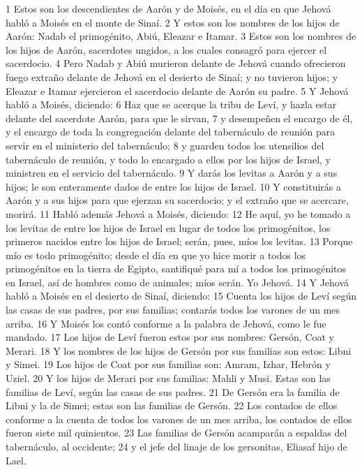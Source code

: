 1 Estos son los descendientes de Aarón y de Moisés, en el día en que Jehová habló a Moisés en el monte de Sinaí.
2 Y estos son los nombres de los hijos de Aarón: Nadab el primogénito, Abiú, Eleazar e Itamar. 
3 Estos son los nombres de los hijos de Aarón, sacerdotes ungidos, a los cuales consagró para ejercer el sacerdocio. 
4 Pero Nadab y Abiú murieron delante de Jehová cuando ofrecieron fuego extraño delante de Jehová en el desierto de Sinaí; y no tuvieron hijos; y Eleazar e Itamar ejercieron el sacerdocio delante de Aarón su padre.
5 Y Jehová habló a Moisés, diciendo:
6 Haz que se acerque la tribu de Leví, y hazla estar delante del sacerdote Aarón, para que le sirvan,
7 y desempeñen el encargo de él, y el encargo de toda la congregación delante del tabernáculo de reunión para servir en el ministerio del tabernáculo;
8 y guarden todos los utensilios del tabernáculo de reunión, y todo lo encargado a ellos por los hijos de Israel, y ministren en el servicio del tabernáculo.
9 Y darás los levitas a Aarón y a sus hijos; le son enteramente dados de entre los hijos de Israel.
10 Y constituirás a Aarón y a sus hijos para que ejerzan su sacerdocio; y el extraño que se acercare, morirá.
11 Habló además Jehová a Moisés, diciendo:
12 He aquí, yo he tomado a los levitas de entre los hijos de Israel en lugar de todos los primogénitos, los primeros nacidos entre los hijos de Israel; serán, pues, míos los levitas.
13 Porque mío es todo primogénito; desde el día en que yo hice morir a todos los primogénitos en la tierra de Egipto, santifiqué para mí a todos los primogénitos en Israel, así de hombres como de animales; míos serán. Yo Jehová.
14 Y Jehová habló a Moisés en el desierto de Sinaí, diciendo:
15 Cuenta los hijos de Leví según las casas de sus padres, por sus familias; contarás todos los varones de un mes arriba.
16 Y Moisés los contó conforme a la palabra de Jehová, como le fue mandado.
17 Los hijos de Leví fueron estos por sus nombres: Gersón, Coat y Merari.
18 Y los nombres de los hijos de Gersón por sus familias son estos: Libni y Simei.
19 Los hijos de Coat por sus familias son: Amram, Izhar, Hebrón y Uziel.
20 Y los hijos de Merari por sus familias: Mahli y Musi. Estas son las familias de Leví, según las casas de sus padres.
21 De Gersón era la familia de Libni y la de Simei; estas son las familias de Gersón.
22 Los contados de ellos conforme a la cuenta de todos los varones de un mes arriba, los contados de ellos fueron siete mil quinientos.
23 Las familias de Gersón acamparán a espaldas del tabernáculo, al occidente;
24 y el jefe del linaje de los gersonitas, Eliasaf hijo de Lael.
